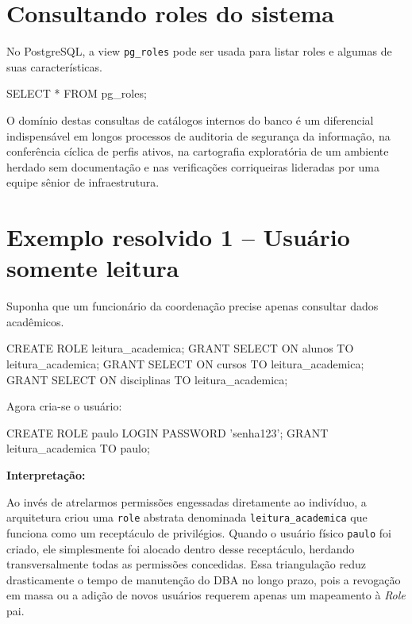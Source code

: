 \section{Consultando roles do sistema}

No PostgreSQL, a view \texttt{pg\_roles} pode ser usada para listar roles e algumas de suas características.

\begin{sqlcode}
SELECT * FROM pg_roles;
\end{sqlcode}

O domínio destas consultas de catálogos internos do banco é um diferencial indispensável em longos processos de auditoria de segurança da informação, na conferência cíclica de perfis ativos, na cartografia exploratória de um ambiente herdado sem documentação e nas verificações corriqueiras lideradas por uma equipe sênior de infraestrutura.

\section{Exemplo resolvido 1 -- Usuário somente leitura}

Suponha que um funcionário da coordenação precise apenas consultar dados acadêmicos.

\begin{sqlcode}
CREATE ROLE leitura_academica;
GRANT SELECT ON alunos TO leitura_academica;
GRANT SELECT ON cursos TO leitura_academica;
GRANT SELECT ON disciplinas TO leitura_academica;
\end{sqlcode}

Agora cria-se o usuário:

\begin{sqlcode}
CREATE ROLE paulo LOGIN PASSWORD 'senha123';
GRANT leitura_academica TO paulo;
\end{sqlcode}

\textbf{Interpretação:}

Ao invés de atrelarmos permissões engessadas diretamente ao indivíduo, a arquitetura criou uma \texttt{role} abstrata denominada \texttt{leitura\_academica} que funciona como um receptáculo de privilégios. Quando o usuário físico \texttt{paulo} foi criado, ele simplesmente foi alocado dentro desse receptáculo, herdando transversalmente todas as permissões concedidas. Essa triangulação reduz drasticamente o tempo de manutenção do DBA no longo prazo, pois a revogação em massa ou a adição de novos usuários requerem apenas um mapeamento à \textit{Role} pai.

